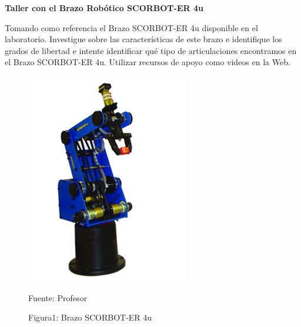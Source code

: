 \textbf{Taller con el Brazo Robótico SCORBOT-ER 4u}

Tomando como referencia el Brazo SCORBOT-ER 4u disponible en el laboratorio. Investigue sobre las características de este brazo e identifique los grados de libertad e intente identificar qué tipo de articulaciones encontramos en el Brazo SCORBOT-ER 4u. Utilizar recursos de apoyo como videos en la Web. 

\begin{figure}[H]
    \centering
    \includegraphics[scale = 0.5]{Imagenes/robot_p1.jpg}
    \caption{Figura1: Brazo SCORBOT-ER 4u }{Fuente: Profesor}
\end{figure} 
